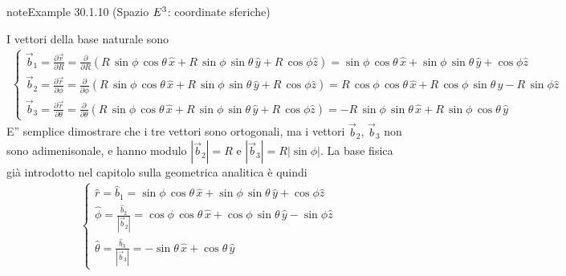 \documentclass[letterpaper,10pt,italian]{jupyterBook}
\begin{document}
\begin{sphinxadmonition}{note}{Example 30.1.10 (Spazio \protect\(E^3\protect\): coordinate sferiche)}



\sphinxAtStartPar
I vettori della base naturale sono
\begin{equation*}
\begin{split}\begin{cases}
  \vec{b}_1 = \frac{\partial \vec{r}}{\partial R     } = \frac{\partial }{\partial R     } \left( R \, \sin \phi \, \cos \theta \, \hat{x} + R \, \sin \phi \, \sin \theta \, \hat{y} + R \, \cos \phi \hat{z} \right) = \sin \phi \, \cos \theta \, \hat{x} + \sin \phi \, \sin \theta \, \hat{y} +  \cos \phi \hat{z} \\
  \vec{b}_2 = \frac{\partial \vec{r}}{\partial \phi  } = \frac{\partial }{\partial \phi  } \left( R \, \sin \phi \, \cos \theta \, \hat{x} + R \, \sin \phi \, \sin \theta \, \hat{y} + R \, \cos \phi \hat{z} \right) = R \, \cos \phi \, \cos \theta \, \hat{x} + R \, \cos \phi \, \sin \theta \, \hat{y} - R \, \sin \phi \hat{z} \\
  \vec{b}_3 = \frac{\partial \vec{r}}{\partial \theta} = \frac{\partial }{\partial \theta} \left( R \, \sin \phi \, \cos \theta \, \hat{x} + R \, \sin \phi \, \sin \theta \, \hat{y} + R \, \cos \phi \hat{z} \right) = - R \, \sin \phi \, \sin \theta \, \hat{x} + R \, \sin \phi \, \cos \theta \, \hat{y}
\end{cases}\end{split}
\end{equation*}
\sphinxAtStartPar
E” semplice dimostrare che i tre vettori sono ortogonali, ma i vettori \(\vec{b}_2\), \(\vec{b}_3\) non sono adimenisonale, e hanno modulo \(|\vec{b}_2| = R\) e \(|\vec{b}_3| = R |\sin \phi|\). La base fisica \sphinxhyphen{} già introdotto nel capitolo sulla geometrica analitica   \sphinxhyphen{} è quindi
\begin{equation*}
\begin{split}\begin{cases}
  \hat{r}      = \hat{b}_1                     = \sin \phi \, \cos \theta \, \hat{x} + \sin \phi \, \sin \theta \, \hat{y} + \cos \phi \hat{z} \\
  \hat{\phi  } = \frac{\hat{b}_2}{|\vec{b}_2|} = \cos \phi \, \cos \theta \, \hat{x} + \cos \phi \, \sin \theta \, \hat{y} - \sin \phi \hat{z} \\
  \hat{\theta} = \frac{\hat{b}_3}{|\vec{b}_3|} =-\sin \theta \, \hat{x} + \cos \theta \, \hat{y}
\end{cases}\end{split}
\end{equation*}\end{sphinxadmonition}
\end{document}
